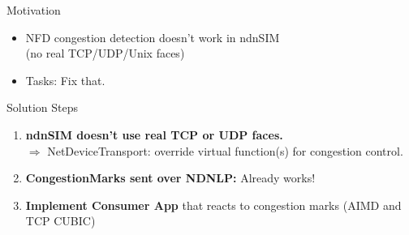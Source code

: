 



\begin{frame}{Motivation}
\begin{itemize}
\item NFD congestion detection doesn't work in ndnSIM\\ (no real TCP/UDP/Unix faces)
\pause
\item Tasks: Fix that. 
\end{itemize}
\end{frame}



\begin{frame}{Solution Steps}

\begin{enumerate}
\item \textbf{ndnSIM doesn't use real TCP or UDP faces.}\\
$\Rightarrow$ NetDeviceTransport: override
virtual function(s) for congestion control.
\pause

\item \textbf{CongestionMarks sent over NDNLP:} Already works! 
\pause

\item \textbf{Implement Consumer App} that reacts to congestion marks (AIMD and TCP CUBIC)

\end{enumerate}

\end{frame}


